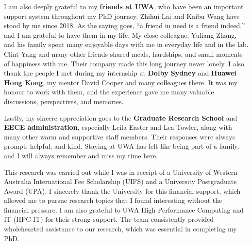 I am also deeply grateful to my \textbf{friends at UWA}, who have been an important support system throughout my PhD journey. Zhihui Lai and Kaibu Wang have stood by me since 2018. As the saying goes, ``a friend in need is a friend indeed,'' and I am grateful to have them in my life. My close colleague, Yuliang Zhang, and his family spent many enjoyable days with me in everyday life and in the lab. Clint Yang and many other friends shared meals, hardships, and small moments of happiness with me. Their company made this long journey never lonely. I also thank the people I met during my internship at \textbf{Dolby Sydney} and \textbf{Huawei Hong Kong}, my mentor David Cooper and many colleagues there. It was my honour to work with them, and the experience gave me many valuable discussions, perspectives, and memories.

Lastly, my sincere appreciation goes to the \textbf{Graduate Research School} and \textbf{EECE administration}, especially Leila Easter and Lea Towler, along with many other warm and supportive staff members. Their responses were always prompt, helpful, and kind. Staying at UWA has felt like being part of a family, and I will always remember and miss my time here.

This research was carried out while I was in receipt of a University of Western Australia International Fee Scholarship (UIFS) and a University Postgraduate Award (UPA). I sincerely thank the University for this financial support, which allowed me to pursue research topics that I found interesting without the financial pressure. I am also grateful to UWA High Performance Computing and IT (HPC-IT) for their strong support. The team consistently provided wholehearted assistance to our research, which was essential in completing my PhD.